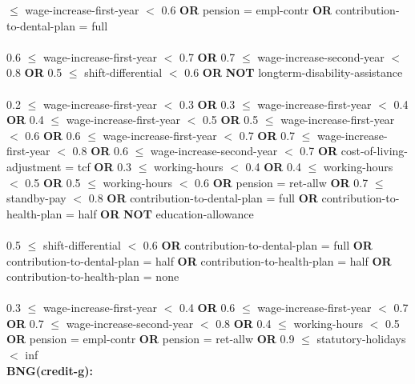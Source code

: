  $\le$ wage-increase-first-year $<$ 0.6 \textbf{OR} pension = empl-contr \textbf{OR} contribution-to-dental-plan = full \\\\0.6 $\le$ wage-increase-first-year $<$ 0.7 \textbf{OR} 0.7 $\le$ wage-increase-second-year $<$ 0.8 \textbf{OR} 0.5 $\le$ shift-differential $<$ 0.6 \textbf{OR}  \textbf{NOT} longterm-disability-assistance \\\\0.2 $\le$ wage-increase-first-year $<$ 0.3 \textbf{OR} 0.3 $\le$ wage-increase-first-year $<$ 0.4 \textbf{OR} 0.4 $\le$ wage-increase-first-year $<$ 0.5 \textbf{OR} 0.5 $\le$ wage-increase-first-year $<$ 0.6 \textbf{OR} 0.6 $\le$ wage-increase-first-year $<$ 0.7 \textbf{OR} 0.7 $\le$ wage-increase-first-year $<$ 0.8 \textbf{OR} 0.6 $\le$ wage-increase-second-year $<$ 0.7 \textbf{OR} cost-of-living-adjustment = tcf \textbf{OR} 0.3 $\le$ working-hours $<$ 0.4 \textbf{OR} 0.4 $\le$ working-hours $<$ 0.5 \textbf{OR} 0.5 $\le$ working-hours $<$ 0.6 \textbf{OR} pension = ret-allw \textbf{OR} 0.7 $\le$ standby-pay $<$ 0.8 \textbf{OR} contribution-to-dental-plan = full \textbf{OR} contribution-to-health-plan = half \textbf{OR}  \textbf{NOT} education-allowance \\\\0.5 $\le$ shift-differential $<$ 0.6 \textbf{OR} contribution-to-dental-plan = full \textbf{OR} contribution-to-dental-plan = half \textbf{OR} contribution-to-health-plan = half \textbf{OR} contribution-to-health-plan = none \\\\0.3 $\le$ wage-increase-first-year $<$ 0.4 \textbf{OR} 0.6 $\le$ wage-increase-first-year $<$ 0.7 \textbf{OR} 0.7 $\le$ wage-increase-second-year $<$ 0.8 \textbf{OR} 0.4 $\le$ working-hours $<$ 0.5 \textbf{OR} pension = empl-contr \textbf{OR} pension = ret-allw \textbf{OR} 0.9 $\le$ statutory-holidays $<$ inf \\

\noindent \textbf{ BNG(credit-g): }\\

